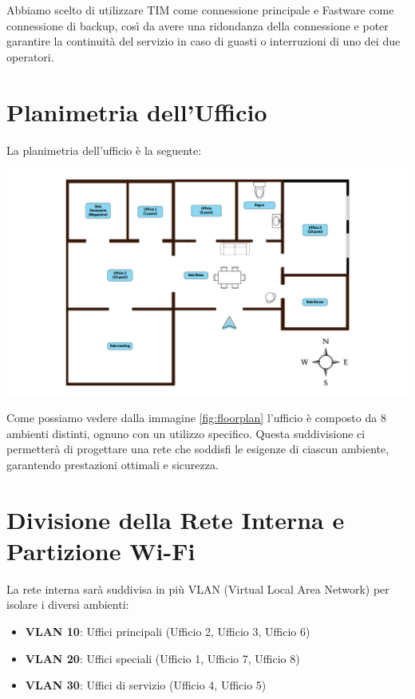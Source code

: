\documentclass{assignment}
\begin{document}
Abbiamo scelto di utilizzare TIM come connessione principale e Fastware come connessione di backup, così da avere una ridondanza della connessione e poter garantire la continuità del servizio in caso di guasti o interruzioni di uno dei due operatori.

\section{Planimetria dell'Ufficio}

La planimetria dell'ufficio è la seguente:

\begin{center}
\includegraphics[width=\textwidth]{assets/Floor Plan Ufficio.png}
\label{fig:floorplan}
\end{center}

Come possiamo vedere dalla immagine \ref{fig:floorplan} l'ufficio è composto da 8 ambienti distinti, ognuno con un utilizzo specifico. Questa suddivisione ci permetterà di progettare una rete che soddisfi le esigenze di ciascun ambiente, garantendo prestazioni ottimali e sicurezza.


\section{Divisione della Rete Interna e Partizione Wi-Fi}
La rete interna sarà suddivisa in più VLAN (Virtual Local Area Network) per isolare i diversi ambienti:

\begin{itemize}
    \item \textbf{VLAN 10}: Uffici principali (Ufficio 2, Ufficio 3, Ufficio 6)
    \item \textbf{VLAN 20}: Uffici speciali (Ufficio 1, Ufficio 7, Ufficio 8)
    \item \textbf{VLAN 30}: Uffici di servizio (Ufficio 4, Ufficio 5)
\end{itemize}
\end{document}
